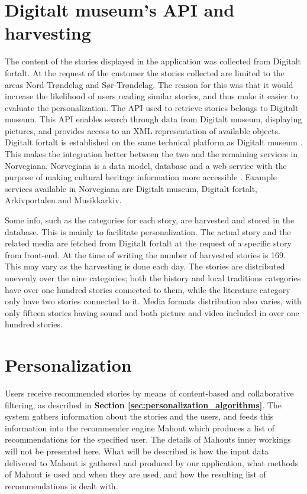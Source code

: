 \section{Digitalt museum's API and harvesting}
\label{sec:harvesting}

The content of the stories displayed in the application was collected from Digitalt fortalt. At the request of the customer the stories collected are limited to the areas Nord-Trøndelag and Sør-Trøndelag. The reason for this was that it would increase the likelihood of users reading similar stories, and thus make it easier to evaluate the personalization. The API \cite{digitaltMuseum} used to retrieve stories belongs to Digitalt museum. This API enables search through data from Digitalt museum, displaying pictures, and provides access to an XML representation of available objects. Digitalt fortalt is established on the same technical platform as Digitalt museum \cite{HM2}. This makes the integration better between the two and the remaining services in Norvegiana. Norvegiana is a data model, database and a web service with the purpose of making cultural heritage information more accessible \cite{HM3}. Example services available in Norvegiana are Digitalt museum, Digitalt fortalt, Arkivportalen and Musikkarkiv.\newline 

Some info, such as the categories for each story, are harvested and stored in the database. This is mainly to facilitate personalization. The actual story and the related media are fetched from Digitalt fortalt at the request of a specific story from front-end. At the time of writing the number of harvested stories is 169. This may vary as the harvesting is done each day. The stories are distributed unevenly over the nine categories; both the history and local traditions categories have over one hundred stories connected to them, while the literature category only have two stories connected to it. Media formats distribution also varies, with only fifteen stories having sound and both picture and video included in over one hundred stories.  

\section{Personalization}
\label{sec:personalization_how}

Users receive recommended stories by means of content-based and collaborative filtering, as described in \textbf{Section \ref{sec:personalization_algorithms}}. The system gathers information about the stories and the users, and feeds this information into the recommender engine Mahout which produces a list of recommendations for the specified user. The details of Mahouts inner workings will not be presented here. What will be described is how the input data delivered to Mahout is gathered and produced by our application, what methods of Mahout is used and when they are used, and how the resulting list of recommendations is dealt with.\newline

